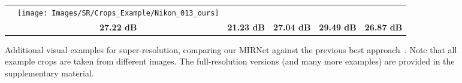 \documentclass[runningheads]{llncs}
\begin{document}
\begin{figure}[t]
\begin{center}
{\begin{tabular}[b]{c@{ } c@{ }  c@{ } c@{ } c@{ } c@{ } }
    &  \texttt{[image: Images/SR/Crops\_Example/Nikon\_013\_ours]}
    \vspace{0.3mm}
    \\
& \textbf{27.22 dB} & \textbf{21.23 dB} & \textbf{27.04 dB} & \textbf{29.49 dB} & \textbf{26.87 dB}
\end{tabular}}
\end{center}
\vspace{-6mm}
\caption{\small Additional visual examples for  super-resolution, comparing our MIRNet against the previous best approach~\cite{RealSR}. Note that all example crops are taken from different images. The full-resolution versions (and many more examples) are provided in the supplementary material. }
\label{fig:sr crop examples}
\vspace{-1.5em}
\end{figure}



\begin{table}[t]
\begin{center}
\caption{\small Cross-camera generalization test for super-resolution. Networks trained for one camera are tested on the other camera. Our MIRNet shows good generalization for all possible cases.}
\label{table:realSR generalization}
\setlength{\tabcolsep}{8.5pt}
\end{center}
\vspace{-2.6em}
\end{table}
\end{document}
